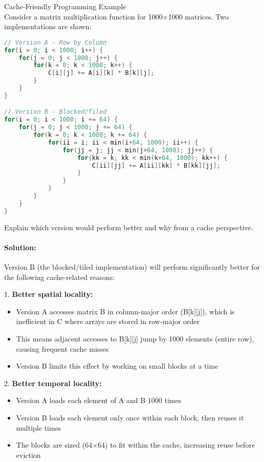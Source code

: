 \begin{example2}{Cache-Friendly Programming Example}\\
Consider a matrix multiplication function for 1000×1000 matrices. Two implementations are shown:

\begin{lstlisting}[language=C, style=basesmol]
// Version A - Row by Column
for(i = 0; i < 1000; i++) {
    for(j = 0; j < 1000; j++) {
        for(k = 0; k < 1000; k++) {
            C[i][j] += A[i][k] * B[k][j];
        }
    }
}

// Version B - Blocked/Tiled
for(i = 0; i < 1000; i += 64) {
    for(j = 0; j < 1000; j += 64) {
        for(k = 0; k < 1000; k += 64) {
            for(ii = i; ii < min(i+64, 1000); ii++) {
                for(jj = j; jj < min(j+64, 1000); jj++) {
                    for(kk = k; kk < min(k+64, 1000); kk++) {
                        C[ii][jj] += A[ii][kk] * B[kk][jj];
                    }
                }
            }
        }
    }
}
\end{lstlisting}

Explain which version would perform better and why from a cache perspective.

\tcblower
\paragraph{Solution:}

Version B (the blocked/tiled implementation) will perform significantly better for the following cache-related reasons:

1. \textbf{Better spatial locality:}
   \begin{itemize}
     \item Version A accesses matrix B in column-major order (B[k][j]), which is inefficient in C where arrays are stored in row-major order
     \item This means adjacent accesses to B[k][j] jump by 1000 elements (entire row), causing frequent cache misses
     \item Version B limits this effect by working on small blocks at a time
   \end{itemize}

2. \textbf{Better temporal locality:}
   \begin{itemize}
     \item Version A loads each element of A and B 1000 times
     \item Version B loads each element only once within each block, then reuses it multiple times
     \item The blocks are sized (64×64) to fit within the cache, increasing reuse before eviction
   \end{itemize}


\end{example2}
